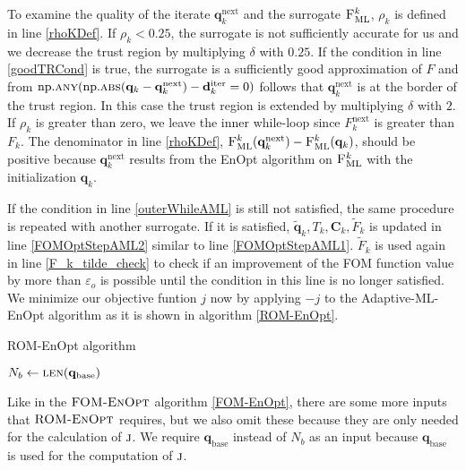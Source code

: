 To examine the quality of the iterate $\mathbf{q}^\mathrm{next}_k$ and the surrogate $\textproc{F$_\mathrm{ML}^k$}$, $\rho_k$ is defined in line \ref{rhoKDef}. If $\rho_k<0.25$, the surrogate is not sufficiently accurate for us and we decrease the trust region by multiplying $\delta$ with $0.25$. If the condition in line \ref{goodTRCond} is true, the surrogate is a sufficiently good approximation of $F$ and from $\mathrm{np.}\Call{any}{\mathrm{np.}\protect\Call{abs}{\mathbf{q}_k-\mathbf{q}^\mathrm{next}_k}-\mathbf{d}^\mathrm{iter}_k = 0}$ follows that $\mathbf{q}^\mathrm{next}_k$ is at the border of the trust region. In this case the trust region is extended by multiplying $\delta$ with $2$. If $\rho_k$ is greater than zero, we leave the inner while-loop since $F^\mathrm{next}_k$ is greater than $F_k$. The denominator in line \ref{rhoKDef}, $\Call{F$_\mathrm{ML}^k$}{\mathbf{q}^\mathrm{next}_k}-\Call{F$_\mathrm{ML}^k$}{\mathbf{q}_k}$, should be positive because $\mathbf{q}^\mathrm{next}_k$ results from the EnOpt algorithm on $\textproc{F$_\mathrm{ML}^k$}$ with the initialization $\mathbf{q}_k$.

If the condition in line \ref{outerWhileAML} is still not satisfied, the same procedure is repeated with another surrogate. If it is satisfied, $\tilde{\mathbf{q}}_k,T_k,\mathbf{C}_k,\tilde{F}_k$ is updated in line \ref{FOMOptStepAML2} similar to line \ref{FOMOptStepAML1}. $\tilde{F}_k$ is used again in line \ref{F_k_tilde_check} to check if an improvement of the FOM function value by more than $\varepsilon_o$ is possible until the condition in this line is no longer satisfied.\\

We minimize our objective funtion $j$ now by applying $-j$ to the Adaptive-ML-EnOpt algorithm as it is shown in algorithm \ref{ROM-EnOpt}.

\begin{algorithm}[H]%
\caption{\label{ROM-EnOpt}ROM-EnOpt algorithm}
\begin{algorithmic}[1]
\State $N_b\gets \Call{len}{\mathbf{q}_\mathrm{base}}$
\State \Return {}
\EndFunction
\end{algorithmic}
\end{algorithm}

Like in the $\textproc{FOM-EnOpt}$ algorithm \ref{FOM-EnOpt}, there are some more inputs that $\textproc{ROM-EnOpt}$ requires, but we also omit these because they are only needed for the calculation of $\textproc{j}$. We require $\mathbf{q}_\mathrm{base}$ instead of $N_b$ as an input because $\mathbf{q}_\mathrm{base}$ is used for the computation of $\textproc{j}$.